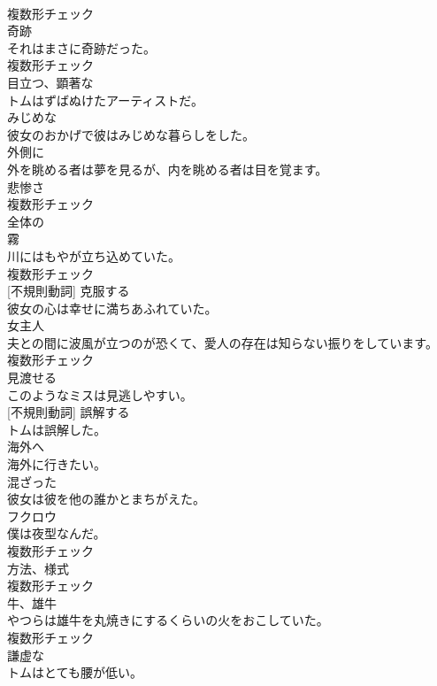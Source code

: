 \documentclass[8pt]{extreport}
\begin{document}
\begin{CJK}{UTF8}{min}
\\	複数形チェック
\\	[名詞]	奇跡	
\\	それはまさに奇跡だった。	
\\	複数形チェック
\\	[形容詞]	目立つ、顕著な	
\\	トムはずばぬけたアーティストだ。	
\\	[形容詞]	みじめな	
\\	彼女のおかげで彼はみじめな暮らしをした。	
\\	[副詞]	外側に	
\\	外を眺める者は夢を見るが、内を眺める者は目を覚ます。	
\\	[名詞]	悲惨さ	
\\	複数形チェック
\\	[形容詞]	全体の	
\\	[名詞]	霧	
\\	川にはもやが立ち込めていた。	
\\	複数形チェック
\\	[動詞] [不規則動詞]	克服する	
\\	彼女の心は幸せに満ちあふれていた。	
\\	[名詞]	女主人	
\\	夫との間に波風が立つのが恐くて、愛人の存在は知らない振りをしています。	
\\	複数形チェック
\\	[動詞]	見渡せる	
\\	このようなミスは見逃しやすい。	
\\	[動詞] [不規則動詞]	誤解する	
\\	トムは誤解した。	
\\	[副詞]	海外へ	
\\	海外に行きたい。	
\\	[形容詞]	混ざった	
\\	彼女は彼を他の誰かとまちがえた。	
\\	[名詞]	フクロウ	
\\	僕は夜型なんだ。	
\\	複数形チェック
\\	[名詞]	方法、様式	
\\	複数形チェック
\\	[名詞]	牛、雄牛	
\\	やつらは雄牛を丸焼きにするくらいの火をおこしていた。	
\\	複数形チェック
\\	[形容詞]	謙虚な	
\\	トムはとても腰が低い。	

\end{CJK}
\end{document}

